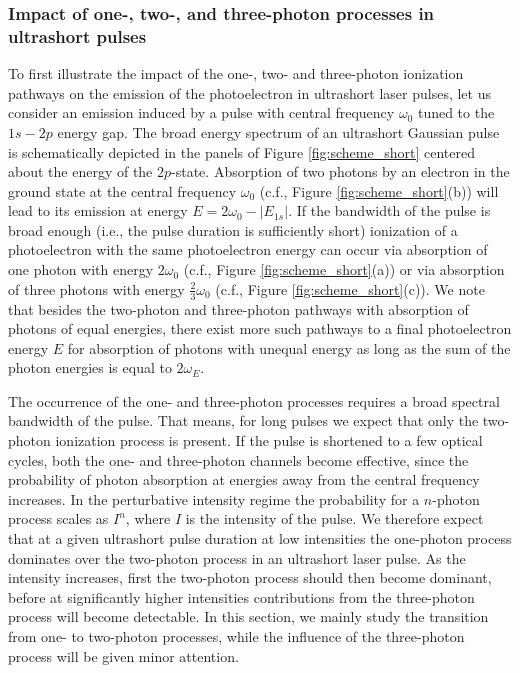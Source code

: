 \subsubsection{\label{ssub:short_scheme}Impact of one-, two-, and three-photon processes in ultrashort pulses}
To first illustrate the impact of the one-, two- and three-photon ionization pathways on the emission of the photoelectron in ultrashort laser pulses, let us consider an emission induced by a pulse with central frequency $\omega_0$ tuned to the $1s-2p$ energy gap. The broad energy spectrum of an ultrashort Gaussian pulse is schematically depicted in the panels of Figure \ref{fig:scheme_short} centered about the energy of the $2p$-state. Absorption of two photons by an electron in the ground state at the central frequency $\omega_0$ (c.f., Figure \ref{fig:scheme_short}(b)) will lead to its emission at energy $E = 2\omega_0 - |E_{1s}|$. If the bandwidth of the pulse is broad enough (i.e., the pulse duration is sufficiently short) ionization of a photoelectron with the same photoelectron energy can occur via absorption of one photon with energy $2 \omega_0$ (c.f., Figure \ref{fig:scheme_short}(a)) or via absorption of three photons with energy $\frac{2}{3} \omega_0$ (c.f., Figure \ref{fig:scheme_short}(c)). We note that besides the two-photon and three-photon pathways with absorption of photons of equal energies, there exist more such pathways to a final photoelectron energy $E$ for absorption of photons with unequal energy as long as the sum of the photon energies is equal to $2 \omega_E$.

The occurrence of the one- and three-photon processes requires a broad spectral bandwidth of the pulse. That means, for long pulses we expect that only the two-photon ionization process is present. If the pulse is shortened to a few optical cycles, both the one- and three-photon channels become effective, since the probability of photon absorption at energies away from the central frequency increases. In the perturbative intensity regime the probability for a $n$-photon process scales as $I^n$, where $I$ is the intensity of the pulse. We therefore expect that at a given ultrashort pulse duration at low intensities the one-photon process dominates over the two-photon process in an ultrashort laser pulse. As the intensity increases, first the two-photon process should then become dominant, before at significantly higher intensities contributions from the three-photon process will become detectable. In this section, we mainly study the transition from one- to two-photon processes, while the influence of the three-photon process will be given minor attention. 


